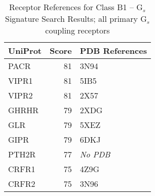 \begin{table}[!h]

\caption{\label{tab:b1-gs-references}Receptor References for Class B1 – G$_{s}$ Signature Search Results; all primary G$_{s}$ coupling receptors}
\centering
\begin{tabular}{lrl}
\toprule
UniProt & Score & PDB References\\
\midrule
PACR & 81 & 3N94\\
VIPR1 & 81 & 5IB5\\
VIPR2 & 81 & 2X57\\
GHRHR & 79 & 2XDG\\
GLR & 79 & 5XEZ\\
GIPR & 79 & 6DKJ\\
PTH2R & 77 & \textit{No PDB}\\
CRFR1 & 75 & 4Z9G\\
CRFR2 & 75 & 3N96\\
\bottomrule
\end{tabular}
\end{table}
